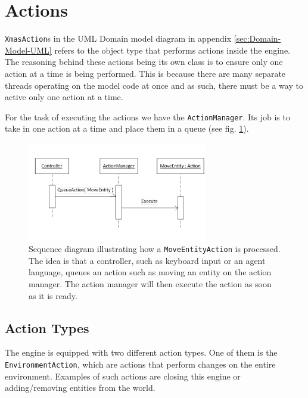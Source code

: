 
\section{Actions}

\texttt{XmasAction}s in the UML Domain model diagram in appendix \ref{sec:Domain-Model-UML}
refers to the object type that performs actions inside the engine.
The reasoning behind these actions being its own class is to ensure
only one action at a time is being performed. This is because there
are many separate threads operating on the model code at once and
as such, there must be a way to active only one action at a time.

For the task of executing the actions we have the \texttt{ActionManager}.
Its job is to take in one action at a time and place them in a queue
(see fig. \ref{fig:ActionQueuing}).

\begin{figure}
\begin{centering}
\includegraphics[width=0.7\textwidth]{ActionQueuing}
\par\end{centering}

\caption{\label{fig:ActionQueuing}Sequence diagram illustrating how a \texttt{MoveEntityAction}
is processed. The idea is that a controller, such as keyboard input
or an agent language, queues an action such as moving an entity on
the action manager. The action manager will then execute the action
as soon as it is ready.}
\end{figure}



\subsection{Action Types}

The engine is equipped with two different action types. One of them
is the \texttt{EnvironmentAction}, which are actions that perform
changes on the entire environment. Examples of such actions are closing
this engine or adding/removing entities from the world.

